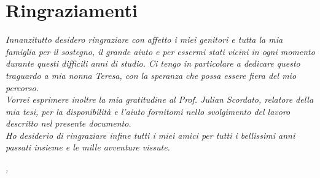 
\cleardoublepage
{}
{}


\bigskip

\begingroup
\let\clearpage\relax
\let\cleardoublepage\relax
\let\cleardoublepage\relax

\chapter*{Ringraziamenti}

\noindent \textit{Innanzitutto desidero ringraziare con affetto i miei genitori e tutta la mia famiglia per il sostegno, il grande aiuto e per essermi stati vicini in ogni momento durante questi difficili anni di studio. Ci tengo in particolare a dedicare questo traguardo a mia nonna Teresa, con la speranza che possa essere fiera del mio percorso.}\\

\noindent \textit{Vorrei esprimere inoltre la mia gratitudine al Prof. Julian Scordato, relatore della mia tesi, per la disponibilità e l'aiuto fornitomi nello svolgimento del lavoro descritto nel presente documento.}\\

\noindent \textit{Ho desiderio di ringraziare infine tutti i miei amici per tutti i bellissimi anni passati insieme e le mille avventure vissute.}\\
\bigskip

\noindent\textit{\myLocation, \myTime}
\hfill \myName

\endgroup

